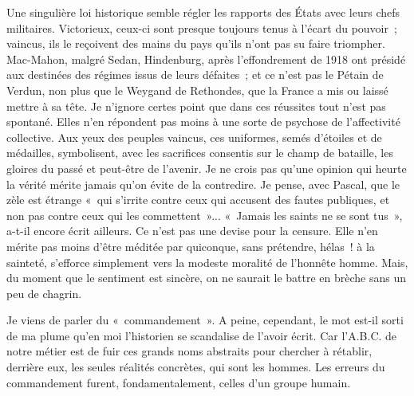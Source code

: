\documentclass[french,twoside]{book} %
\begin{document}
Une singulière loi historique semble régler les rapports des États avec leurs chefs militaires. Victorieux, ceux-ci sont presque toujours tenus à l’écart du pouvoir ; vaincus, ils le reçoivent des mains du pays qu’ils n’ont pas su faire triompher. Mac-Mahon, malgré Sedan, Hindenburg, après l’effondrement de 1918 ont présidé aux destinées des régimes issus de leurs défaites ; et ce n’est pas le Pétain de Verdun, non plus que le Weygand de Rethondes, que la France a mis ou laissé mettre à sa tête. Je n’ignore certes point que dans ces réussites tout n’est pas spontané. Elles n’en répondent pas moins à une sorte de psychose de l’affectivité collective. Aux yeux des peuples vaincus, ces uniformes, semés d’étoiles et de médailles, symbolisent, avec les sacrifices consentis sur le champ de bataille, les gloires du passé et peut-être de l’avenir. Je ne crois pas qu’une opinion qui heurte la vérité mérite jamais qu’on évite de la contredire. Je pense, avec Pascal, que le zèle est étrange « qui s’irrite contre ceux qui accusent des fautes publiques, et non pas contre ceux qui les commettent »... « Jamais les saints ne se sont tus », a-t-il encore écrit ailleurs. Ce n’est pas une devise pour la censure. Elle n’en mérite pas moins d’être méditée par quiconque, sans prétendre, hélas ! à   la sainteté, s’efforce simplement vers la modeste moralité de l’honnête homme. Mais, du moment que le sentiment est sincère, on ne saurait le battre en brèche sans un peu de chagrin.\par
Je viens de parler du « commandement ». A peine, cependant, le mot est-il sorti de ma plume qu’en moi l’historien se scandalise de l’avoir écrit. Car l’A.B.C. de notre métier est de fuir ces grands noms abstraits pour chercher à rétablir, derrière eux, les seules réalités concrètes, qui sont les hommes. Les erreurs du commandement furent, fondamentalement, celles d’un groupe humain.\par
\end{document}

